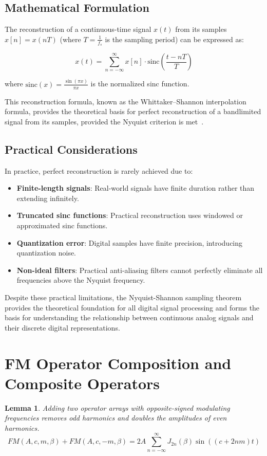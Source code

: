 \documentclass[11pt,twoside]{report}
\newtheorem{lem}[thm]{Lemma}
\numberwithin{thm}{section}
\numberwithin{equation}{section}
\begin{document}
\subsection*{Mathematical Formulation}

The reconstruction of a continuous-time signal $x(t)$ from its samples $x[n] = x(nT)$ (where $T = \frac{1}{f_s}$ is the sampling period) can be expressed as:

$$x(t) = \sum_{n=-\infty}^{\infty} x[n] \cdot \text{sinc}\left(\frac{t-nT}{T}\right)$$

where $\text{sinc}(x) = \frac{\sin(\pi x)}{\pi x}$ is the normalized sinc function.

This reconstruction formula, known as the Whittaker–Shannon interpolation formula, provides the theoretical basis for perfect reconstruction of a bandlimited signal from its samples, provided the Nyquist criterion is met~\cite{pollock_whittaker}.

\subsection*{Practical Considerations}

In practice, perfect reconstruction is rarely achieved due to:

\begin{itemize}
    \item \textbf{Finite-length signals}: Real-world signals have finite duration rather than extending infinitely.
    
    \item \textbf{Truncated sinc functions}: Practical reconstruction uses windowed or approximated sinc functions.
    
    \item \textbf{Quantization error}: Digital samples have finite precision, introducing quantization noise.
    
    \item \textbf{Non-ideal filters}: Practical anti-aliasing filters cannot perfectly eliminate all frequencies above the Nyquist frequency.
\end{itemize}

Despite these practical limitations, the Nyquist-Shannon sampling theorem provides the theoretical foundation for all digital signal processing and forms the basis for understanding the relationship between continuous analog signals and their discrete digital representations.

\section*{FM Operator Composition and Composite Operators}
\label{sec:2_2}
\begin{lem} Adding two operator arrays with opposite-signed modulating frequencies removes odd harmonics and doubles the amplitudes of even harmonics.
$$\displaystyle FM(A, c, m, \beta) + FM(A, c, -m, \beta) = 2A\sum_{n=-\infty}^\infty J_{2n}(\beta)\sin((c + 2nm)t)$$
\end{lem}
\end{document}
